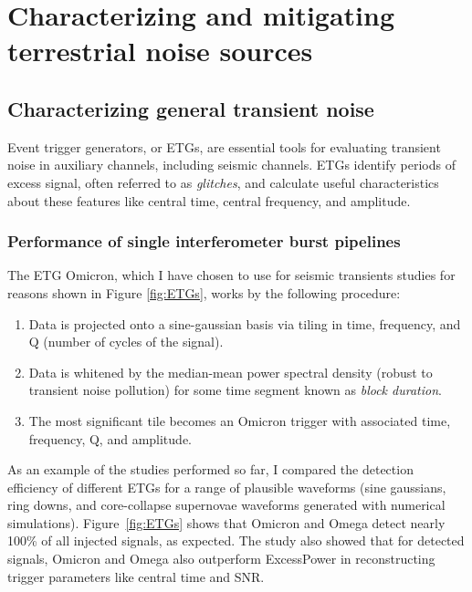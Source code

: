 \chapter{Characterizing and mitigating terrestrial noise sources} \label{c:DetChar}

\section{Characterizing general transient noise } 

Event trigger generators, or ETGs, are essential tools for evaluating transient noise in auxiliary channels, including seismic channels. ETGs identify periods of excess signal, often referred to as \textit{glitches}, and calculate useful characteristics about these features like central time, central frequency, and amplitude.

\subsection{Performance of single interferometer burst pipelines}
The ETG Omicron, which I have chosen to use for seismic transients studies for reasons shown in Figure \ref{fig:ETGs}, works by the following procedure: 
\begin{enumerate}
\item Data is projected onto a sine-gaussian basis via tiling in time, frequency, and Q (number of cycles of the signal).
\item Data is whitened by the median-mean power spectral density (robust to transient noise pollution) 
for some time segment known as \textit{block duration}.
\item The most significant tile becomes an Omicron trigger with 
associated time, frequency, Q, and amplitude. 
\end{enumerate}

As an example of the studies performed so far, I compared the detection efficiency of different ETGs for a range of plausible \gw{} waveforms (sine gaussians, ring downs, and core-collapse supernovae waveforms generated with numerical simulations). Figure~\ref{fig:ETGs} shows that Omicron and Omega detect nearly 100\% of all injected signals, as expected. The study also showed that for detected signals, Omicron and Omega also outperform ExcessPower in reconstructing trigger parameters like central time and SNR. 
 
